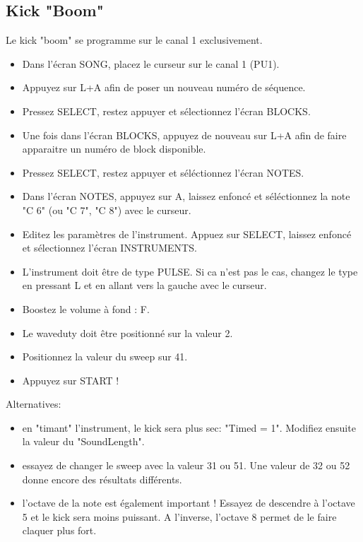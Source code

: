 \documentclass[12pt,a4paper]{article}
\begin{document}
    \subsection{Kick "Boom"}

    Le kick "boom" se programme sur le canal 1 exclusivement.

    \begin{itemize}
    \item{Dans l'écran SONG, placez le curseur sur le canal 1 (PU1).}
    \item{Appuyez sur L+A afin de poser un nouveau numéro de séquence.}
    \item{Pressez SELECT, restez appuyer et sélectionnez l'écran BLOCKS.}
    \item{Une fois dans l'écran BLOCKS, appuyez de nouveau sur L+A afin de faire apparaitre un numéro de block disponible.}
    \item{Pressez SELECT, restez appuyer et séléctionnez l'écran NOTES.}
    \item{Dans l'écran NOTES, appuyez sur A, laissez enfoncé et séléctionnez la note "C 6" (ou "C 7", "C 8") avec le curseur.}
    \item{Editez les paramètres de l'instrument. Appuez sur SELECT, laissez enfoncé et sélectionnez l'écran INSTRUMENTS.}
    \item{L'instrument doit être de type PULSE. Si ca n'est pas le cas, changez le type en pressant L et en allant vers la gauche avec le curseur.}
    \item{Boostez le volume à fond : F.}
    \item{Le waveduty doit être positionné sur la valeur 2.}
    \item{Positionnez la valeur du sweep sur 41.}
    \item{Appuyez sur START !}
    \end{itemize}\medskip

    Alternatives:
    \begin{itemize}
    \item{en "timant" l'instrument, le kick sera plus sec: "Timed = 1". Modifiez ensuite la valeur du "SoundLength".}
    \item{essayez de changer le sweep avec la valeur 31 ou 51. Une valeur de 32 ou 52 donne encore des résultats différents.}
    \item{l'octave de la note est également important ! Essayez de descendre à l'octave 5 et le kick sera moins puissant. A l'inverse, l'octave 8 permet de le faire claquer plus fort.}
    \end{itemize}\medskip
\end{document}
